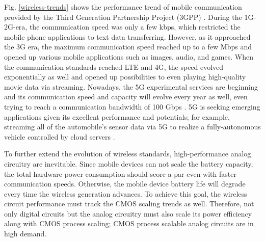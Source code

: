 Fig. \ref{wireless-trends} shows the performance trend of mobile communication provided by the Third Generation Partnership Project (3GPP) \cite{3gpp}. During the 1G-2G-era, the communication speed was only a few kbps, which restricted the mobile phone applications to text data transferring. However, as it approached the 3G era, the maximum communication speed reached up to a few Mbps and opened up various mobile applications such as images, audio, and games. When the communication standards reached LTE and 4G, the speed evolved exponentially as well and opened up possibilities to even playing high-quality movie data via streaming. Nowadays, the 5G experimental services are beginning and its communication speed and capacity will evolve every year as well, even trying to reach a communication bandwidth of 100 Gbps \cite{sasaki2018experiment}. 5G is seeking emerging applications given its excellent performance and potentials; for example, streaming all of the automobile's sensor data via 5G to realize a fully-autonomous vehicle controlled by cloud servers \cite{autonomous}.

To further extend the evolution of wireless standards, high-performance analog circuitry are inevitable. Since mobile devices can not scale the battery capacity, the total hardware power consumption should score a par even with faster communication speeds. Otherwise, the mobile device battery life will degrade every time the wireless generation advances. To achieve this goal, the wireless circuit performance must track the CMOS scaling trends as well. Therefore, not only digital circuits but the analog circuitry must also scale its power efficiency along with CMOS process scaling; CMOS process scalable analog circuits are in high demand.


